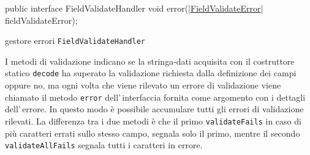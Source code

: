 \documentclass[a4paper,10pt]{report}
\newif\ifesource
\newenvironment{elisting}[1][H]
  {\captionsetup{aboveskip=0pt}\begin{listing}[#1]}
  {\end{listing}%
}
\begin{document}
\ifesource
\begin{figure*}[!htb]
\begin{lstlisting}[language=java, 
caption={gestore errori \texttt{FieldValidateHandler}}, 
label=lst:FieldValidateHandler:java]
public interface FieldValidateHandler {
    void error((|hyperref[lst:FieldValidateError:java]{FieldValidateError}| fieldValidateError);
}
\end{lstlisting}
\end{figure*}
\else
\begin{elisting}[!htb]
\begin{javacode}
public interface FieldValidateHandler {
    void error(|\hyperref[lst:FieldValidateError:java]{FieldValidateError}| fieldValidateError);
}
\end{javacode}
\caption{gestore errori \texttt{FieldValidateHandler}}
\label{lst:FieldValidateHandler:java}
\end{elisting}
\fi

I metodi di validazione indicano se la stringa-dati
acquisita con il costruttore statico \texttt{decode} ha superato la validazione
richiesta dalla definizione dei campi oppure no, ma ogni volta che viene 
rilevato un errore di validazione viene chiamato il metodo \texttt{error}
dell'\,interfaccia fornita come argomento con i dettagli dell'\,errore.
In questo modo è possibile accumulare tutti gli errori di validazione rilevati.
La differenza tra i due metodi è che il primo \texttt{validateFails} in caso di
più caratteri errati sullo stesso campo, segnala solo il primo, mentre il 
secondo \texttt{validateAllFails} segnala tutti i caratteri in errore.
\end{document}
